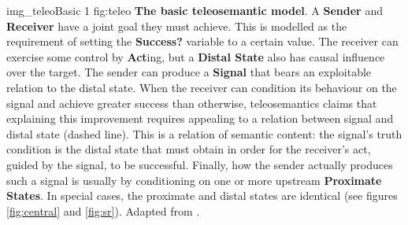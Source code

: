 \begin{myfig}
    {img_teleoBasic} %
    {1} %
    {fig:teleo} %
    {\textbf{The basic teleosemantic model}. 
    A \textbf{Sender} and \textbf{Receiver} have a joint goal they must achieve. 
    This is modelled as the requirement of setting the \textbf{Success?} variable to a certain value. 
    The receiver can exercise some control by \textbf{Act}ing, but a \textbf{Distal State} also has causal influence over the target. 
    The sender can produce a \textbf{Signal} that bears an exploitable relation to the distal state.
    When the receiver can condition its behaviour on the signal and achieve greater success than otherwise, teleosemantics claims that explaining this improvement requires appealing to a relation between signal and distal state (dashed line).
    This is a relation of semantic content: the signal's truth condition is the distal state that must obtain in order for the receiver's act, guided by the signal, to be successful.
    Finally, how the sender actually produces such a signal is usually by conditioning on one or more upstream \textbf{Proximate States}.
    In special cases, the proximate and distal states are identical (see figures \ref{fig:central} and \ref{fig:sr}).
    Adapted from \citet[fig. 6.3, p. 78]{millikan2004varieties}.
    } %
\end{myfig}